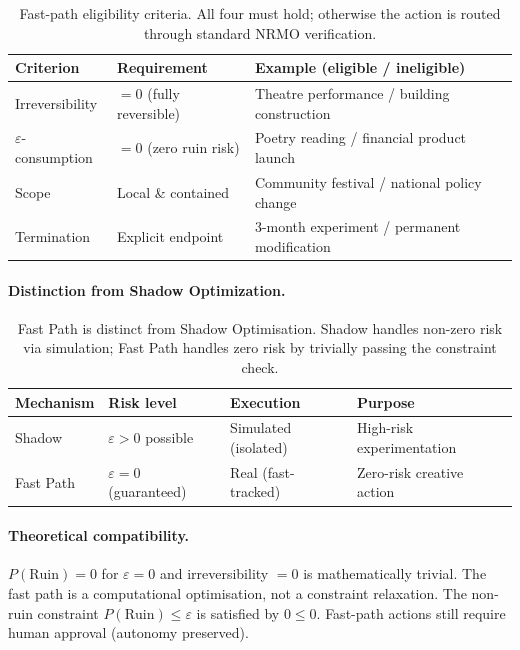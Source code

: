 \begin{table}[ht]
\centering
\small
\begin{tabularx}{\linewidth}{lXX}
\toprule
\textbf{Criterion} & \textbf{Requirement} & \textbf{Example (eligible / ineligible)} \\
\midrule
Irreversibility
& $= 0$ (fully reversible)
& Theatre performance / building construction \\
$\varepsilon$-consumption
& $= 0$ (zero ruin risk)
& Poetry reading / financial product launch \\
Scope
& Local \& contained
& Community festival / national policy change \\
Termination
& Explicit endpoint
& 3-month experiment / permanent modification \\
\bottomrule
\end{tabularx}
\caption[Fast-path eligibility]{Fast-path eligibility criteria. All
four must hold; otherwise the action is routed through standard
NRMO verification.}
\label{tab:fast-path-eligibility}
\end{table}

\paragraph{Distinction from Shadow Optimization.}

\begin{table}[ht]
\centering
\small
\begin{tabularx}{\linewidth}{lXXX}
\toprule
\textbf{Mechanism} & \textbf{Risk level} & \textbf{Execution} & \textbf{Purpose} \\
\midrule
Shadow
& $\varepsilon > 0$ possible
& Simulated (isolated)
& High-risk experimentation \\
Fast Path
& $\varepsilon = 0$ (guaranteed)
& Real (fast-tracked)
& Zero-risk creative action \\
\bottomrule
\end{tabularx}
\caption[Fast Path vs Shadow]{Fast Path is distinct from Shadow
Optimisation. Shadow handles non-zero risk via simulation; Fast Path
handles zero risk by trivially passing the constraint check.}
\label{tab:fast-path-vs-shadow}
\end{table}

\paragraph{Theoretical compatibility.}
$P(\mathrm{Ruin}) = 0$ for $\varepsilon = 0$ and irreversibility
$= 0$ is mathematically trivial. The fast path is a computational
optimisation, not a constraint relaxation. The non-ruin constraint
$P(\mathrm{Ruin}) \le \varepsilon$ is satisfied by $0 \le 0$.
Fast-path actions still require human approval (autonomy preserved).

